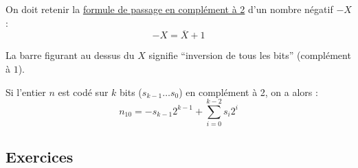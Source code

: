 \documentclass[a4paper,11pt]{article}
\begin{document}
On doit retenir la \underline{formule de passage en complément à 2} d'un nombre négatif $-X$ :
\begin{equation}
-X=\overline{X}+1
\end{equation}

La barre figurant au dessus du $X$ signifie ``inversion de tous les bits'' (complément à $1$).

Si l'entier $n$ est codé sur $k$ bits ($s_{k-1}\dots s_0$) en complément à 2, on a alors :
\begin{equation}
n_{10}=-s_{k-1}2^{k-1}+\sum_{i=0}^{k-2} s_i2^i
\end{equation}

\subsection*{Exercices}
\end{document}
